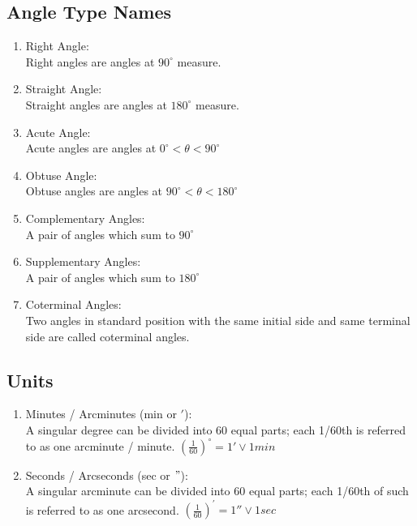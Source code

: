 \documentclass{article}
\begin{document}
\subsection{Angle Type Names}
\begin{enumerate}
  \item Right Angle:\\
    Right angles are angles at $90^{\circ}$ measure.

  \item Straight Angle:\\
    Straight angles are angles at $180^{\circ}$ measure. 

  \item Acute Angle:\\
    Acute angles are angles at $0^{\circ} < \theta < 90^{\circ}$

  \item Obtuse Angle:\\
    Obtuse angles are angles at $90^{\circ} < \theta < 180^{\circ}$\\

  \item Complementary Angles: \\
    A pair of angles which sum to $90^{\circ}$

  \item Supplementary Angles: \\ 
    A pair of angles which sum to $180^{\circ}$

  \item Coterminal Angles: \\
    Two angles in standard position with the same initial side and same terminal
    side are called coterminal angles. \\
\end{enumerate}
  
\subsection{Units}
\begin{enumerate}
  \item Minutes / Arcminutes (min or $'$): \\ 
    A singular degree can be divided into 60 equal parts; each 1/60th is referred to
    as one arcminute / minute. $\left(\frac{1}{60}\right)^{\circ}=1'\lor 1min$ 
  \item Seconds / Arcseconds (sec or $"$): \\
    A singular arcminute can be divided into 60 equal parts; each 1/60th of such
    is referred to as one arcsecond. $\left(\frac{1}{60}\right)^{'}=1''\lor 1sec$
\end{enumerate}
\end{document}

